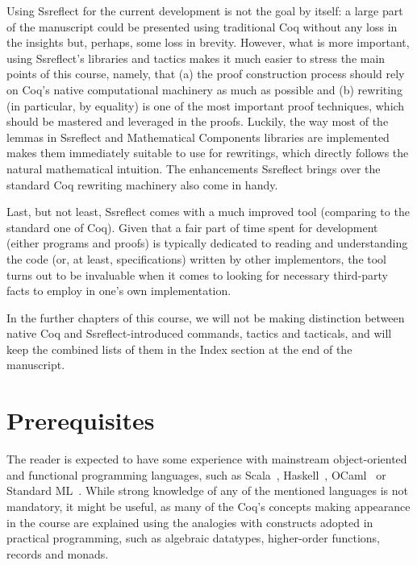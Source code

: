 Using Ssreflect for the current development is not the goal by itself: a large part of the manuscript could be presented using traditional Coq without any loss in the insights but, perhaps, some loss in brevity. However, what is more important, using Ssreflect's libraries and tactics makes it much easier to stress the main points of this course, namely, that (a) the proof construction process should rely on Coq's native computational machinery as much as possible and (b) rewriting (in particular, by equality) is one of the most important proof techniques, which should be mastered and leveraged in the proofs. Luckily, the way most of the lemmas in Ssreflect and Mathematical Components libraries are implemented makes them immediately suitable to use for rewritings, which directly follows the natural mathematical intuition. The enhancements Ssreflect brings over the standard Coq rewriting machinery also come in handy.


Last, but not least, Ssreflect comes with a much improved  tool (comparing to the standard one of Coq). Given that a fair part of time spent for development (either programs and proofs) is typically dedicated to reading and understanding the code (or, at least, specifications) written by other implementors, the  tool turns out to be invaluable when it comes to looking for necessary third-party facts to employ in one's own implementation.


In the further chapters of this course, we will not be making distinction between native Coq and Ssreflect-introduced commands, tactics and tacticals, and will keep the combined lists of them in the Index section at the end of the manuscript.


\section{Prerequisites}




The reader is expected to have some experience with mainstream object-oriented and functional programming languages, such as Scala~\cite{Scala-spec}, Haskell~\cite{Haskell-report}, OCaml~\cite{Ocaml-spec} or Standard ML~\cite{SML-report}. While strong knowledge of any of the mentioned languages is not mandatory, it might be useful, as many of the Coq's concepts making appearance in the course are explained using the analogies with constructs adopted in practical programming, such as algebraic datatypes, higher-order functions, records and monads.


